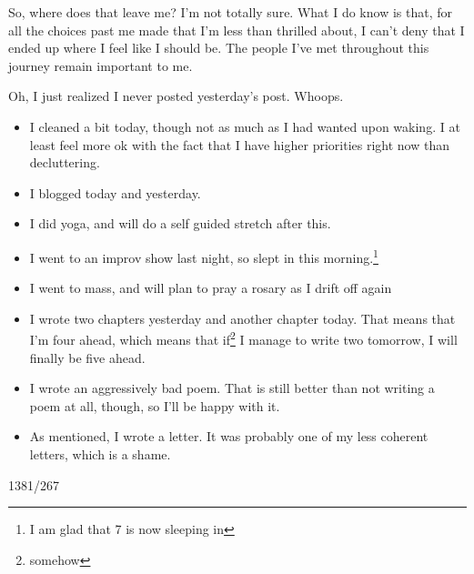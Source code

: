 \documentclass[12pt]{article}[titlepage]
\renewcommand{\,}{\textsuperscript{,}}
\begin{document}
So, where does that leave me?
I'm not totally sure.
What I do know is that, for all the choices past me made that I'm less than thrilled about, I can't deny that I ended up where I feel like I should be.
The people I've met throughout this journey remain important to me.

Oh, I just realized I never posted yesterday's post.
Whoops.

\begin{itemize}
\item I cleaned a bit today, though not as much as I had wanted upon waking. I at least feel more ok with the fact that I have higher priorities right now than decluttering.
\item I blogged today and yesterday.
\item I did yoga, and will do a self guided stretch after this.
\item I went to an improv show last night, so slept in this morning.\footnote{I am glad that 7 is now sleeping in}
\item I went to mass, and will plan to pray a rosary as I drift off again
\item I wrote two chapters yesterday and another chapter today. That means that I'm four ahead, which means that if\footnote{somehow} I manage to write two tomorrow, I will finally be five ahead.
\item I wrote an aggressively bad poem. That is still better than not writing a poem at all, though, so I'll be happy with it.
\item As mentioned, I wrote a letter. It was probably one of my less coherent letters, which is a shame.
\end{itemize}
1381/267
\end{document}
